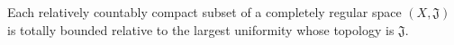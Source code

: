 Each relatively countably compact subset of a completely regular space $(X, \mathfrak{J})$ is totally bounded relative to the largest uniformity whose topology is $\mathfrak{J}$.
